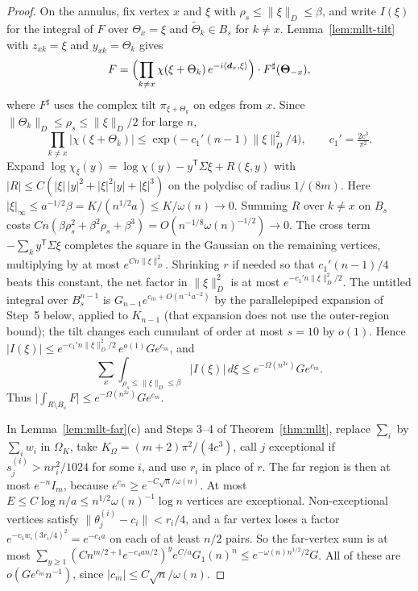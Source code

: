 \documentclass[11pt]{article}
\begin{document}
\begin{proof}
On the annulus, fix vertex \(x\) and \(\xi\) with
\(\rho_s\le\|\xi\|_D\le\beta\), and write \(I(\xi)\) for the integral of \(F\) over
\(\Theta_x=\xi\) and \(\tilde\Theta_k\in B_s\) for \(k\ne x\).
Lemma~\ref{lem:mllt-tilt} with \(z_{xk}=\xi\) and \(y_{xk}=\Theta_k\) gives
\[
F=\Bigl(\prod_{k\ne x}\chi(\xi+\Theta_k)\,e^{-i\langle\boldsymbol d_x,\xi\rangle}\Bigr)
\cdot F^\sharp(\boldsymbol\Theta_{-x}),
\]
where \(F^\sharp\) uses the complex tilt \(\pi_{\xi+\Theta_k}\) on edges from \(x\).
Since \(\|\Theta_k\|_D\le\rho_s\le\|\xi\|_D/2\) for large \(n\),
\[
\prod_{k\ne x}|\chi(\xi+\Theta_k)|
\le\exp\bigl(-c_1'(n-1)\|\xi\|_D^2/4\bigr),\qquad c_1'=\tfrac{2c^3}{\pi^2}.
\]
Expand
\(\log\chi_\xi(y)=\log\chi(y)-y^{\mathsf T}\Sigma\xi+R(\xi,y)\) with
\(|R|\le C(|\xi|\,|y|^2+|\xi|^2|y|+|\xi|^3)\) on the polydisc of radius
\(1/(8m)\). Here
\(|\xi|_\infty\le a^{-1/2}\beta=K/(n^{1/2}a)\le K/\omega(n)\to0\).
Summing \(R\) over \(k\ne x\) on \(B_s\) costs
\(Cn(\beta\rho_s^2+\beta^2\rho_s+\beta^3)=O(n^{-1/8}\omega(n)^{-1/2})\to0\).
The cross term \(-\sum_ky^{\mathsf T}\Sigma\xi\) completes the square in the
Gaussian on the remaining vertices, multiplying by at most
\(e^{Cn\|\xi\|_D^2}\). Shrinking \(r\) if needed so that
\(c_1'(n-1)/4\) beats this constant, the net factor in \(\|\xi\|_D^2\) is at most
\(e^{-c_1'n\|\xi\|_D^2/2}\).
The untitled integral over \(B_s^{n-1}\) is
\(G_{n-1}e^{c_m+O(n^{-1}a^{-2})}\) by the parallelepiped expansion of
Step~5 below, applied to \(K_{n-1}\) (that expansion does not use the
outer-region bound); the tilt changes each cumulant of order at most
\(s=10\) by \(o(1)\). Hence
\(|I(\xi)|\le e^{-c_1'n\|\xi\|_D^2/2}\,e^{o(1)}Ge^{c_m}\), and
\[
\sum_x\int_{\rho_s\le\|\xi\|_D\le\beta}|I(\xi)|\,d\xi
\le e^{-\Omega(n^{2\varepsilon})}Ge^{c_m}.
\]
Thus \(\bigl|\int_{R\setminus B_s}F\bigr|\le e^{-\Omega(n^{2\varepsilon})}Ge^{c_m}\).

In Lemma~\ref{lem:mllt-far}(c) and Steps 3--4 of Theorem~\ref{thm:mllt}, replace
\(\sum_i\) by \(\sum_iw_i\) in \(\Omega_K\), take \(K_\Omega=(m+2)\pi^2/(4c^3)\), call
\(j\) exceptional if \(s^{(i)}_j>nr_i^2/1024\) for some \(i\), and use \(r_i\) in
place of \(r\). The far region is then at most \(e^{-n}I_m\), because
\(e^{c_m}\ge e^{-C\sqrt n/\omega(n)}\). At most
\(E\le C\log n/a\le n^{1/2}\omega(n)^{-1}\log n\) vertices are exceptional.
Non-exceptional vertices satisfy \(\|\theta^{(i)}_j-c_i\|<r_i/4\), and a far
vertex loses a factor \(e^{-c_1w_i(3r_i/4)^2}=e^{-c_4a}\) on each of at least
\(n/2\) pairs. So the far-vertex sum is at most
\(\sum_{y\ge1}(Cn^{m/2+1}e^{-c_4an/2})^ye^{C/a}G_1(n)^n
\le e^{-\omega(n)n^{1/2}/2}G\).
All of these are \(o(Ge^{c_m}n^{-1})\), since \(|c_m|\le C\sqrt n/\omega(n)\).


\end{proof}
\end{document}
